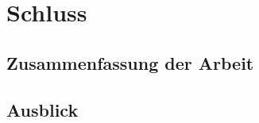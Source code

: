\chapter{Schluss}\label{ch:abschluss}


\section{Zusammenfassung der Arbeit}


\section{Ausblick}\label{sec:schluss-ausblick}
